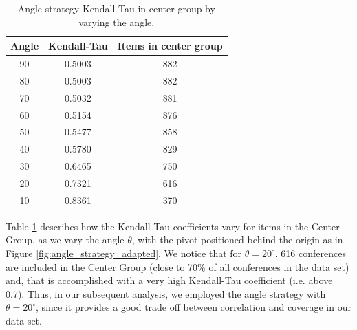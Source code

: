 \documentclass[notitlepage]{svjour3}
\begin{document}
\begin{table}[h!]
\centering
 \begin{tabular}{c c c} 
 \toprule
 Angle & Kendall-Tau & Items in center group \\ 
 \midrule
 
 90 & 0.5003 & 882 \\
 80 & 0.5003 & 882 \\
 70 & 0.5032 & 881 \\
 60 & 0.5154 & 876 \\
 50 & 0.5477 & 858 \\
 40 & 0.5780 & 829 \\
 30 & 0.6465 & 750 \\
 20 & 0.7321 & 616 \\
 10 & 0.8361 & 370 \\
 \bottomrule
 \end{tabular}
 \caption{Angle strategy Kendall-Tau in center group by varying the angle.}
 \label{tab:angle_strategy}
\end{table}

Table \ref{tab:angle_strategy} describes how the Kendall-Tau coefficients vary for items 
in the Center Group, as we vary the angle $ \theta $, with the pivot positioned behind 
the origin as in Figure \ref{fig:angle_strategy_adapted}. We notice that for $ \theta = 20^{\circ} $, 
616 conferences are included in the Center
Group (close to 70\% of all conferences in the data set) and, that is accomplished with a very high Kendall-Tau 
coefficient (i.e. above 0.7). Thus, in our subsequent 
analysis, we employed the angle strategy with $ \theta = 20^{\circ} $, since it provides 
a good trade off between correlation and coverage in our data set.
\end{document}
